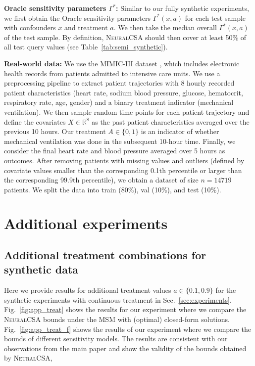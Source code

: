 \documentclass{article} %
\newcommand{\R}{\mathbb{R}}
\newcommand{\frameworkname}{\textsc{NeuralCSA}\xspace}
\theoremstyle{definition}
\theoremstyle{plain}
\begin{document}
\textbf{Oracle sensitivity parameters $\Gamma^\ast$:} Similar to our fully synthetic experiments, we first obtain the Oracle sensitivity parameters $\Gamma^\ast(x, a)$ for each test sample with confounders $x$ and treatment $a$. We then take the median overall $\Gamma^\ast(x, a)$ of the test sample. By definition, \frameworkname should then cover at least 50\% of all test query values (see Table~\ref{tab:semi_synthetic}).  

\textbf{Real-world data:} We use the MIMIC-III dataset \cite{Johnson.2016}, which includes electronic health records from patients admitted to intensive care units. We use a preprocessing pipeline \cite{Wang.2020} to extract patient trajectories with 8 hourly recorded patient characteristics (heart rate, sodium blood pressure, glucose, hematocrit, respiratory rate, age, gender) and a binary treatment indicator (mechanical ventilation). We then sample random time points for each patient trajectory and define the covariates $X \in \R^8$ as the past patient characteristics averaged over the previous 10 hours. Our treatment $A \in \{0, 1\}$ is an indicator of whether mechanical ventilation was done in the subsequent 10-hour time. Finally, we consider the final heart rate and blood pressure averaged over 5 hours as outcomes. After removing patients with missing values and outliers (defined by covariate values smaller than the corresponding 0.1th percentile or larger than the corresponding 99.9th percentile), we obtain a dataset of size $n=14719$ patients. We split the data into train (80\%), val (10\%), and test (10\%).

\clearpage

\section{Additional experiments}\label{app:more_exp}

\subsection{Additional treatment combinations for synthetic data}

Here we provide results for additional treatment values $a \in \{0.1, 0.9\}$ for the synthetic experiments with continuous treatment in Sec.~\ref{sec:experiments}. Fig.~\ref{fig:app_treat} shows the results for our experiment where we compare the \frameworkname bounds under the MSM with (optimal) closed-form solutions. Fig.~\ref{fig:app_treat_f} shows the results of our experiment where we compare the bounds of different sensitivity models. The results are consistent with our observations from the main paper and show the validity of the bounds obtained by \frameworkname,
\end{document}
